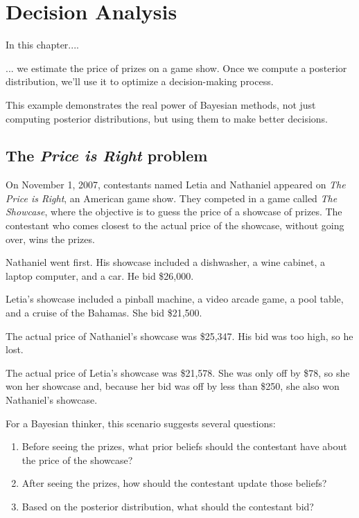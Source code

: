\documentclass[12pt]{book}
\theoremstyle{exercise}
\begin{document}
\chapter{Decision Analysis}
\label{decisionanalysis}

In this chapter....

... we estimate the price of prizes on a game show.
Once we compute a posterior distribution, we'll use it to optimize a decision-making process.

This example demonstrates the real power of Bayesian methods, not just computing posterior distributions, but using them to make better decisions.


\section{The {\it Price is Right} problem}

On November 1, 2007, contestants named Letia and Nathaniel appeared
on {\it The Price is Right}, an American game show.  They competed in
a game called {\it The Showcase}, where the objective is to guess the price
of a showcase of prizes.  The contestant who comes closest to the
actual price of the showcase, without going over, wins the prizes.


Nathaniel went first.  His showcase included a dishwasher, a wine
cabinet, a laptop computer, and a car.  He bid \$26,000.

Letia's showcase included a pinball machine, a video arcade game, a
pool table, and a cruise of the Bahamas.  She bid \$21,500.

The actual price of Nathaniel's showcase was \$25,347.  His bid
was too high, so he lost.

The actual price of Letia's showcase was \$21,578.  She was only
off by \$78, so she won her showcase and, because
her bid was off by less than \$250, she also won Nathaniel's
showcase.

For a Bayesian thinker, this scenario suggests several questions:

\begin{enumerate}

\item Before seeing the prizes, what prior beliefs should the
  contestant have about the price of the showcase?

\item After seeing the prizes, how should the contestant update
  those beliefs?

\item Based on the posterior distribution, what should the
  contestant bid?

\end{enumerate}
\end{document}
